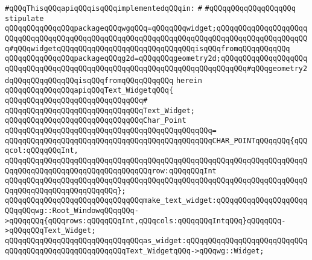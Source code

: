\verb|#qQQqThisqQQqapiqQQqisqQQqimplementedqQQqin:|\newline
\verb|#|\newline
\verb|#qQQqqQQqqQQqqQQqqQQq|\newline
\newline
\verb|stipulate|\newline
\verb|qQQqqQQqqQQqqQQqpackageqQQqwgqQQq=qQQqqQQqwidget;qQQqqQQqqQQqqQQqqQQqqQQqqQQqqQQqqQQqqQQqqQQqqQQqqQQqqQQqqQQqqQQqqQQqqQQqqQQqqQQqqQQqqQQqqQQq#qQQqwidgetqQQqqQQqqQQqqQQqqQQqqQQqqQQqqQQqisqQQqfromqQQqqQQqqQQq|\newline
\verb|qQQqqQQqqQQqqQQqpackageqQQqg2d=qQQqqQQqgeometry2d;qQQqqQQqqQQqqQQqqQQqqQQqqQQqqQQqqQQqqQQqqQQqqQQqqQQqqQQqqQQqqQQqqQQqqQQqqQQq#qQQqgeometry2dqQQqqQQqqQQqqQQqisqQQqfromqQQqqQQqqQQq|\newline
\verb|herein|\newline
\newline
\verb|qQQqqQQqqQQqqQQqapiqQQqText_WidgetqQQq{|\newline
\verb|qQQqqQQqqQQqqQQqqQQqqQQqqQQqqQQq#|\newline
\verb|qQQqqQQqqQQqqQQqqQQqqQQqqQQqqQQqText_Widget;|\newline
\newline
\verb|qQQqqQQqqQQqqQQqqQQqqQQqqQQqqQQqChar_Point|\newline
\verb|qQQqqQQqqQQqqQQqqQQqqQQqqQQqqQQqqQQqqQQqqQQqqQQq=|\newline
\verb|qQQqqQQqqQQqqQQqqQQqqQQqqQQqqQQqqQQqqQQqqQQqqQQqCHAR_POINTqQQqqQQq{qQQqcol:qQQqqQQqInt,|\newline
\verb|qQQqqQQqqQQqqQQqqQQqqQQqqQQqqQQqqQQqqQQqqQQqqQQqqQQqqQQqqQQqqQQqqQQqqQQqqQQqqQQqqQQqqQQqqQQqqQQqqQQqqQQqrow:qQQqqQQqInt|\newline
\verb|qQQqqQQqqQQqqQQqqQQqqQQqqQQqqQQqqQQqqQQqqQQqqQQqqQQqqQQqqQQqqQQqqQQqqQQqqQQqqQQqqQQqqQQqqQQqqQQq};|\newline
\newline
\verb|qQQqqQQqqQQqqQQqqQQqqQQqqQQqqQQqmake_text_widget:qQQqqQQqqQQqqQQqqQQqqQQqqQQqwg::Root_WindowqQQqqQQq->qQQqqQQq{qQQqrows:qQQqqQQqInt,qQQqcols:qQQqqQQqIntqQQq}qQQqqQQq->qQQqqQQqText_Widget;|\newline
\newline
\verb|qQQqqQQqqQQqqQQqqQQqqQQqqQQqqQQqas_widget:qQQqqQQqqQQqqQQqqQQqqQQqqQQqqQQqqQQqqQQqqQQqqQQqqQQqqQQqText_WidgetqQQq->qQQqwg::Widget;|\newline
